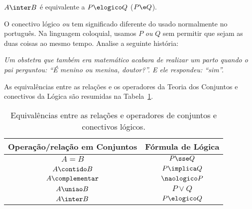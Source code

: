 \begin{proposition}
	$A \inter B$ é equivalente a $P \elogico Q$ ($P \e Q$).
\end{proposition}

\begin{remark}
    O conectivo lógico \textit{ou} tem significado diferente do usado normalmente no português. Na linguagem coloquial, usamos $P$ \textit{ou} $Q$ sem permitir que sejam as duas coisas ao mesmo tempo. Analise a seguinte história:

    \emph{Um obstetra que também era matemático acabara de realizar um parto quando o pai perguntou: ``É menino ou menina, doutor?''. E ele respondeu: ``sim''.}
\end{remark}

As equivalências entre as relações e os operadores da Teoria dos Conjuntos e conectivos da Lógica são resumidas na Tabela~\ref{tbl:equiv-conj-logc}.
\begin{table}[h]
	\centering
    \begin{tabular}{|c|c|}
        \hline
        Operação/relação em Conjuntos & Fórmula de Lógica \\ \hline
        $A = B$                 	  & $P \sse Q$        \\ \hline
        $A \contido B$            	  & $P \implica Q$    \\ \hline
        $A\complementar$        	  & $\naologico P$    \\ \hline
        $A \uniao B$              	  & $P \lor Q$        \\ \hline
        $A \inter B$              	  & $P \elogico Q$    \\
        \hline
    \end{tabular}
	\caption{Equivalências entre as relações e operadores de conjuntos e conectivos lógicos.}
	\label{tbl:equiv-conj-logc}
\end{table}

